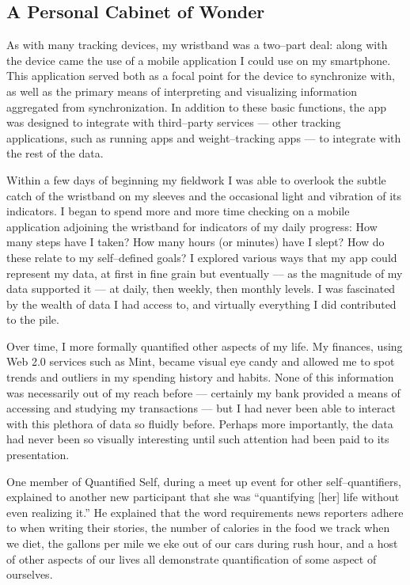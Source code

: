 \documentclass{article}
\begin{document}
\subsection*{A Personal Cabinet of Wonder}
As with many tracking devices,
my wristband was a two--part deal:
along with the device came the use of a mobile application I could use on my smartphone.
This application served both as a focal point for the device to synchronize with,
as well as the primary means of interpreting and visualizing information aggregated from synchronization.
In addition to these basic functions,
the app was designed to integrate with third--party services
--- other tracking applications,
such as running apps and weight--tracking apps
--- to integrate with the rest of the data.

Within a few days of beginning my fieldwork I was able to overlook the subtle catch of the wristband on my sleeves and the occasional light and vibration of its indicators.
I began to spend more and more time checking on a mobile application adjoining the wristband for indicators of my daily progress:
How many steps have I taken? How many hours (or minutes) have I slept? How do these relate to my self--defined goals? I explored various ways that my app could represent my data,
at first in fine grain but eventually
--- as the magnitude of my data supported it ---
at daily,
then weekly,
then monthly levels.
I was fascinated by the wealth of data I had access to,
and virtually everything I did contributed to the pile.

Over time,
I more formally quantified other aspects of my life.
My finances,
using Web 2.0 services such as Mint,
became visual eye candy and allowed me to spot trends and outliers in my spending history and habits.
None of this information was necessarily out of my reach before
--- certainly my bank provided a means of accessing and studying my transactions ---
but I had never been able to interact with this plethora of data so fluidly before.
Perhaps more importantly,
the data had never been so visually interesting until such attention had been paid to its presentation.

One member of Quantified Self,
during a meet up event for other self--quantifiers,
explained to another new participant that she was ``quantifying [her] life without even realizing it.'' He explained that the word requirements news reporters adhere to when writing their stories,
the number of calories in the food we track when we diet,
the gallons per mile we eke out of our cars during rush hour,
and a host of other aspects of our lives all demonstrate quantification of some aspect of ourselves.
\end{document}
